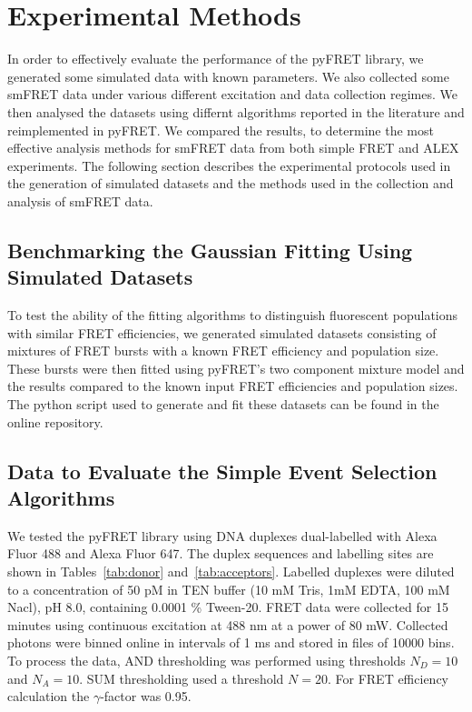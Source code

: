 \section{Experimental Methods}
In order to effectively evaluate the performance of the pyFRET library, we generated some simulated data with known parameters.  We also collected some smFRET data under various different excitation and data collection regimes. We then analysed the datasets using differnt algorithms reported in the literature and reimplemented in pyFRET. We  compared the results, to determine the most effective analysis methods for smFRET data from both simple FRET and ALEX experiments. The following section describes the experimental protocols used in the generation of simulated datasets and the methods used in the collection and analysis of smFRET data. 

\subsection{Benchmarking the Gaussian Fitting Using Simulated Datasets}
To test the ability of the fitting algorithms to distinguish fluorescent populations with similar FRET efficiencies, we generated simulated datasets consisting of mixtures of FRET bursts with a known FRET efficiency and population size. These bursts were then fitted using pyFRET's two component mixture model and the results compared to the known input FRET efficiencies and population sizes. The python script used to generate and fit these datasets can be found in the online repository. 

\subsection{Data to Evaluate the Simple Event Selection Algorithms}
We tested the pyFRET library using DNA duplexes dual-labelled with Alexa Fluor 488 and Alexa Fluor 647. The duplex sequences and labelling sites are shown in Tables~\ref{tab:donor} and~\ref{tab:acceptors}. Labelled duplexes were diluted to a concentration of 50 pM in TEN buffer (10 mM Tris, 1mM EDTA, 100 mM Nacl), pH 8.0, containing 0.0001 \% Tween-20. FRET data were collected for 15 minutes using continuous excitation at 488 nm at a power of 80 mW. Collected photons were binned online in intervals of 1 ms and stored in files of 10000 bins. To process the data, AND thresholding was performed using thresholds $N_D = 10$ and $N_A = 10$. SUM thresholding used a threshold $N = 20$. For FRET efficiency calculation the $\gamma$-factor was 0.95.

